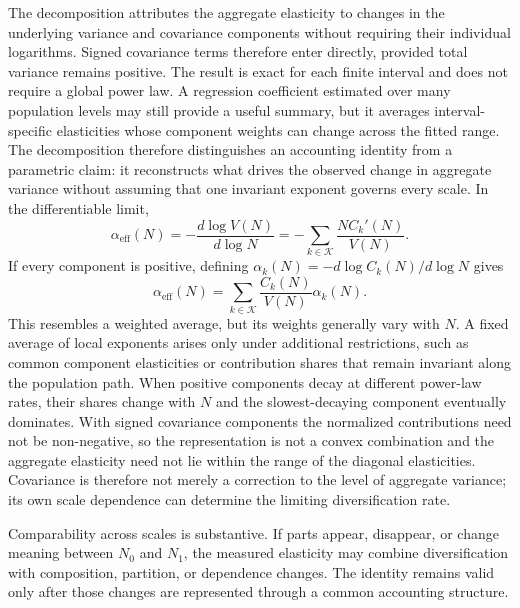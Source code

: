 \documentclass[a4paper,fleqn]{cas-dc}
\begin{document}
The decomposition attributes the aggregate elasticity to changes in the
underlying variance and covariance components without requiring their
individual logarithms. Signed covariance terms therefore enter directly,
provided total variance remains positive. The result is exact for each
finite interval and does not require a global power law. A regression
coefficient estimated over many population levels may still provide a
useful summary, but it averages interval-specific elasticities whose
component weights can change across the fitted range. The decomposition
therefore distinguishes an accounting identity from a parametric claim:
it reconstructs what drives the observed change in aggregate variance
without assuming that one invariant exponent governs every scale. In the
differentiable limit,
\begin{equation}
\label{eq:local_signed_decomposition}
    \alpha_{\mathrm{eff}}(N)
    =-
    \frac{d\log V(N)}{d\log N}
    =-
    \sum_{k\in\mathcal{K}}
    \frac{N C_k'(N)}{V(N)}.
\end{equation}
If every component is positive, defining
$\alpha_k(N)=-d\log C_k(N)/d\log N$ gives
\begin{equation}
\label{eq:weighted_local_alpha}
    \alpha_{\mathrm{eff}}(N)
    =
    \sum_{k\in\mathcal{K}}
    \frac{C_k(N)}{V(N)}\alpha_k(N).
\end{equation}
This resembles a weighted average, but its weights generally vary with
$N$. A fixed average of local exponents arises only under additional
restrictions, such as common component elasticities or contribution
shares that remain invariant along the population path. When positive
components decay at different power-law rates, their shares change with
$N$ and the slowest-decaying component eventually dominates. With signed
covariance components the normalized contributions need not be
non-negative, so the representation is not a convex combination and the
aggregate elasticity need not lie within the range of the diagonal
elasticities. Covariance is therefore not merely a correction to the
level of aggregate variance; its own scale dependence can determine the
limiting diversification rate.

Comparability across scales is substantive. If parts appear, disappear,
or change meaning between $N_0$ and $N_1$, the measured elasticity may
combine diversification with composition, partition, or dependence
changes. The identity remains valid only after those changes are
represented through a common accounting structure.
\end{document}
